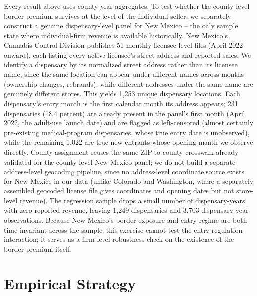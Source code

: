 \documentclass[12pt]{article}
\begin{document}
Every result above uses county-year aggregates. To test whether the county-level border premium survives at
the level of the individual seller, we separately construct a genuine dispensary-level panel for New Mexico --
the only sample state where individual-firm revenue is available historically. New Mexico's Cannabis Control
Division publishes 51 monthly licensee-level files (April 2022 onward), each listing every active licensee's
street address and reported sales. We identify a dispensary by its normalized street address rather than its
licensee name, since the same location can appear under different names across months (ownership changes,
rebrands), while different addresses under the same name are genuinely different stores. This yields 1{,}253
unique dispensary locations. Each dispensary's entry month is the first calendar month its address appears;
231 dispensaries (18.4 percent) are already present in the panel's first month (April 2022, the adult-use
launch date) and are flagged as left-censored (almost certainly pre-existing medical-program dispensaries,
whose true entry date is unobserved), while the remaining 1{,}022 are true new entrants whose opening month we
observe directly. County assignment reuses the same ZIP-to-county crosswalk already validated for the
county-level New Mexico panel; we do not build a separate address-level geocoding pipeline, since no
address-level coordinate source exists for New Mexico in our data (unlike Colorado and Washington, where a
separately assembled geocoded license file gives coordinates and opening dates but not store-level revenue).
The regression sample drops a small number of dispensary-years with zero reported revenue, leaving 1{,}249
dispensaries and 3{,}703 dispensary-year observations. Because New Mexico's border exposure and entry regime
are both time-invariant across the sample, this exercise cannot test the entry-regulation interaction; it
serves as a firm-level robustness check on the existence of the border premium itself.

\section{Empirical Strategy}
\label{sec:methods}
\end{document}
